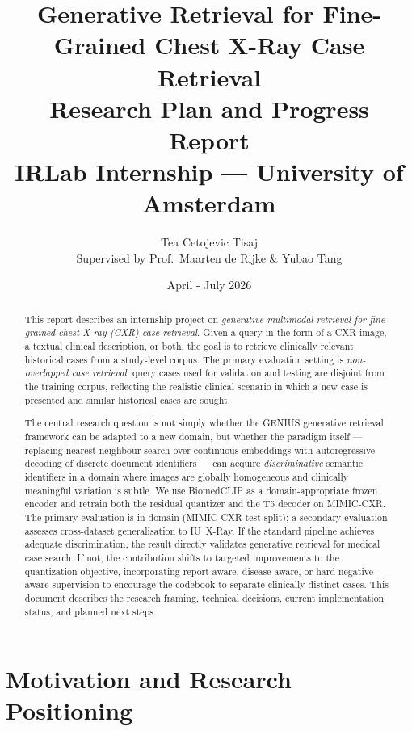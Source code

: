 \documentclass[11pt,a4paper]{article}
\title{%
    \textbf{Generative Retrieval for Fine-Grained Chest X-Ray Case Retrieval}\\[0.4em]
    \large Research Plan and Progress Report\\[0.2em]
    \normalsize IRLab Internship --- University of Amsterdam
}
\author{Tea Cetojevic Tisaj \\ \small Supervised by Prof.\ Maarten de Rijke \& Yubao Tang}
\date{April - July 2026}
\begin{document}
\maketitle

\begin{abstract}
This report describes an internship project on \emph{generative multimodal
retrieval for fine-grained chest X-ray (CXR) case retrieval}.
Given a query in the form of a CXR image, a textual clinical description, or
both, the goal is to retrieve clinically relevant historical cases from a
study-level corpus.
The primary evaluation setting is \emph{non-overlapped case retrieval}: query
cases used for validation and testing are disjoint from the training corpus,
reflecting the realistic clinical scenario in which a new case is presented and
similar historical cases are sought.

The central research question is not simply whether the GENIUS generative
retrieval framework can be adapted to a new domain, but whether the paradigm
itself --- replacing nearest-neighbour search over continuous embeddings with
autoregressive decoding of discrete document identifiers --- can acquire
\emph{discriminative} semantic identifiers in a domain where images are globally
homogeneous and clinically meaningful variation is subtle.
We use BiomedCLIP as a domain-appropriate frozen encoder and retrain both the
residual quantizer and the T5 decoder on MIMIC-CXR.
The primary evaluation is in-domain (MIMIC-CXR test split); a secondary
evaluation assesses cross-dataset generalisation to IU~X-Ray.
If the standard pipeline achieves adequate discrimination, the result directly
validates generative retrieval for medical case search.
If not, the contribution shifts to targeted improvements to the quantization
objective, incorporating report-aware, disease-aware, or hard-negative-aware
supervision to encourage the codebook to separate clinically distinct cases.
This document describes the research framing, technical decisions, current
implementation status, and planned next steps.
\end{abstract}

\tableofcontents
\vspace{1em}

\section{Motivation and Research Positioning}
\end{document}
